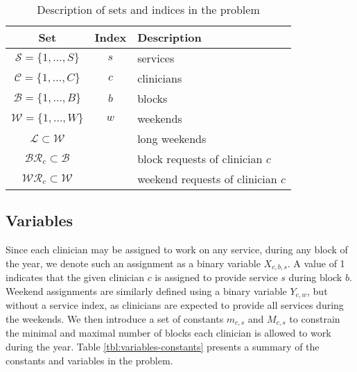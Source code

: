 \begin{table}[h]
	\centering
	\begin{tabular}{ c c l }
		\hline
		\textbf{Set}                         & \textbf{Index} & \textbf{Description}              \\ \hline
		$\mathcal{S} = \{1, \ldots, S \}$    & $s$            & services                          \\
		$\mathcal{C} = \{1, \ldots, C \}$    & $c$            & clinicians                        \\
		$\mathcal{B} = \{1, \ldots, B \}$    & $b$            & blocks                            \\
		$\mathcal{W} = \{1, \ldots, W \}$    & $w$            & weekends                          \\
		$\mathcal{L} \subset \mathcal{W}$    &                & long weekends                     \\
		$\mathcal{BR}_c \subset \mathcal{B}$ &                & block requests of clinician $c$   \\
		$\mathcal{WR}_c \subset \mathcal{W}$ &                & weekend requests of clinician $c$
	\end{tabular}
	\caption{Description of sets and indices in the problem}
	\label{tbl:sets-indices}
\end{table}

\subsection{Variables} \label{sec:meth-variables}
Since each clinician may be assigned to work on any service, during any block of the year, we denote such an assignment as a binary variable $X_{c, b, s}$. A value of 1 indicates that the given clinician $c$ is assigned to provide service $s$ during block $b$. Weekend assignments are similarly defined using a binary variable $Y_{c, w}$, but without a service index, as clinicians are expected to provide all services during the weekends. We then introduce a set of constants $m_{c, s}$ and $M_{c, s}$ to constrain the minimal and maximal number of blocks each clinician is allowed to work during the year. Table \ref{tbl:variables-constants} presents a summary of the constants and variables in the problem.

